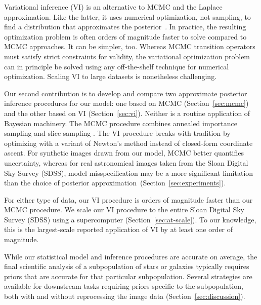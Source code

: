 Variational inference (VI) is an alternative to MCMC and the Laplace approximation. Like the latter, it uses numerical optimization, not sampling, to find a distribution that approximates the posterior~\citep{blei2017variational}. In practice, the resulting optimization problem is often orders of magnitude faster to solve compared to MCMC approaches. It can be simpler, too. Whereas MCMC transition operators must satisfy strict constraints for validity, the variational optimization problem can in principle be solved using any off-the-shelf technique for numerical optimization. Scaling VI to large datasets is nonetheless challenging.

Our second contribution is to develop and compare two approximate posterior inference procedures for our model: one based on MCMC (Section~\ref{sec:mcmc}) and the other based on VI (Section~\ref{sec:vi}).
Neither is a routine application of Bayesian machinery.
The MCMC procedure combines annealed importance sampling and slice sampling \citep{neal2001annealed, neal2003slice}.
The VI procedure breaks with tradition by optimizing with a variant of Newton's method instead of closed-form coordinate ascent.
For synthetic images drawn from our model, MCMC better quantifies uncertainty, whereas for real astronomical images taken from the Sloan Digital Sky Survey (SDSS), model misspecification may be a more significant limitation than the choice of posterior approximation~(Section~\ref{sec:experiments}).

For either type of data, our VI procedure is orders of magnitude faster than our MCMC procedure.
We scale our VI procedure to the entire Sloan Digital Sky Survey (SDSS) using a supercomputer (Section~\ref{sec:at-scale}).
To our knowledge, this is the largest-scale reported application of VI by at least one order of magnitude.

While our statistical model and inference procedures are accurate on average, the final scientific analysis of a subpopulation of stars or galaxies typically requires priors that are accurate for that particular subpopulation. Several strategies are available for downstream tasks requiring priors specific to the subpopulation, both with and without reprocessing the image data (Section~\ref{sec:discussion}).